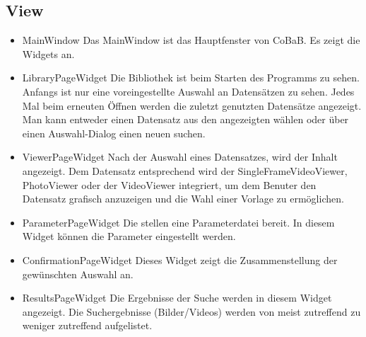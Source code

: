 \subsection*{View}
\begin{itemize}
\item MainWindow \newline
Das MainWindow ist das Hauptfenster von CoBaB. Es zeigt die Widgets an.

\item LibraryPageWidget \newline
Die Bibliothek ist beim Starten des Programms zu sehen. Anfangs ist nur eine voreingestellte Auswahl an Datensätzen zu sehen. Jedes Mal beim erneuten Öffnen werden die zuletzt genutzten Datensätze angezeigt. Man kann entweder einen Datensatz aus den angezeigten wählen oder über einen Auswahl-Dialog einen neuen suchen.

\item ViewerPageWidget \newline
Nach der Auswahl eines Datensatzes, wird der Inhalt angezeigt. Dem Datensatz entsprechend wird der SingleFrameVideoViewer, PhotoViewer oder der VideoViewer integriert, um dem Benuter den Datensatz grafisch anzuzeigen und die Wahl einer Vorlage zu ermöglichen.

\item ParameterPageWidget \newline
Die  stellen eine Parameterdatei bereit. In diesem Widget können die Parameter eingestellt werden.

\item ConfirmationPageWidget \newline 
Dieses Widget zeigt die Zusammenstellung der gewünschten Auswahl an.

\item ResultsPageWidget \newline
Die Ergebnisse der Suche werden in diesem Widget angezeigt. Die Suchergebnisse (Bilder/Videos) werden von meist zutreffend zu weniger zutreffend aufgelistet. 

\end{itemize}
